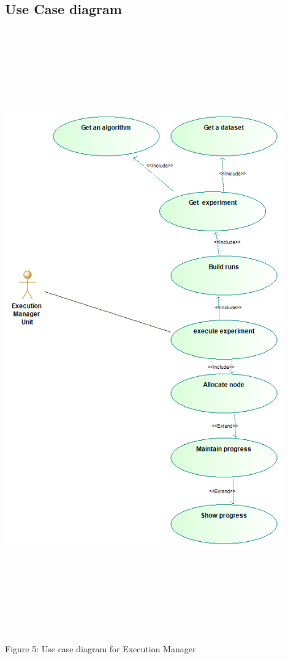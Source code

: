 \subsection{Use Case diagram}
    \includegraphics[width=12cm,height=26cm,keepaspectratio]{execution_manager/images/execution_manager_use_case_diagram.png}
    \begin{center}
    	\small{Figure 5: Use case diagram for Execution Manager}
    \end{center}
